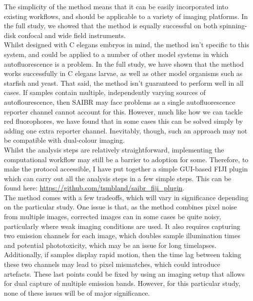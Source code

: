 \documentclass[12pt]{"article"}
\begin{document}
The simplicity of the method means that it can be easily incorporated into existing workflows, and should be applicable to a variety of imaging platforms. In the full study, we showed that the method is equally successful on both spinning-disk confocal and wide field instruments. \\

Whilst designed with C elegans embryos in mind, the method isn't specific to this system, and could be applied to a number of other model systems in which autofluorescence is a problem. In the full study, we have shown that the method works successfully in C elegans larvae, as well as other model organisms such as starfish and yeast. That said, the method isn’t guaranteed to perform well in all cases. If samples contain multiple, independently varying sources of autoflourescence, then SAIBR may face problems as a single autofluorescence reporter channel cannot account for this. However, much like how we can tackle red fluorophores, we have found that in some cases this can be solved simply by adding one extra reporter channel. Inevitably, though, such an approach may not be compatible with dual-colour imaging. \\

Whilst the analysis steps are relatively straightforward, implementing the computational workflow may still be a barrier to adoption for some. Therefore, to make the protocol accessible, I have put together a simple GUI-based FIJI plugin which can carry out all the analysis steps in a few simple steps. This can be found here: \url{https://github.com/tsmbland/saibr_fiji_plugin}. \\

The method comes with a few tradeoffs, which will vary in significance depending on the particular study. One issue is that, as the method combines pixel noise from multiple images, corrected images can in some cases be quite noisy, particularly where weak imaging conditions are used. It also requires capturing two emission channels for each image, which doubles sample illumination times and potential phototoxicity, which may be an issue for long timelapses. Additionally, if samples display rapid motion, then the time lag between taking these two channels may lead to pixel mismatches, which could introduce artefacts. These last points could be fixed by using an imaging setup that allows for dual capture of multiple emission bands. However, for this particular study, none of these issues will be of major significance. \\
\end{document}
